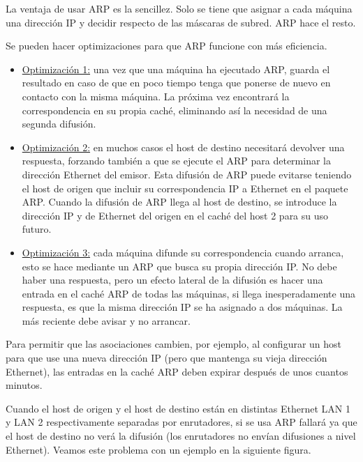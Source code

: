 	\par La ventaja de usar ARP es la sencillez. Solo se tiene que asignar a cada máquina una dirección IP y decidir respecto de las máscaras de subred. ARP hace el resto.
	
	\par Se pueden hacer optimizaciones para que ARP funcione con más eficiencia.
	
		\begin{itemize}
			\item \underline{Optimización 1:} una vez que una máquina ha ejecutado ARP, guarda el resultado en caso de que en poco tiempo tenga que ponerse de nuevo en contacto con la misma máquina. La próxima vez encontrará la correspondencia en su propia caché, eliminando así la necesidad de una segunda difusión.

			\item \underline{Optimización 2:} en muchos casos el host de destino necesitará devolver una respuesta, forzando también a que se ejecute el ARP para determinar la dirección Ethernet del emisor. Esta difusión de ARP puede evitarse teniendo el host de origen que incluir su correspondencia IP a Ethernet en el paquete ARP. Cuando la difusión de ARP llega al host de destino, se introduce la dirección IP y de Ethernet del origen en el caché del host 2 para su uso futuro.
			
			\item \underline{Optimización 3:} cada máquina difunde su correspondencia cuando arranca, esto se hace mediante un ARP que busca su propia dirección IP. No debe haber una respuesta, pero un efecto lateral de la difusión es hacer una entrada en el caché ARP de todas las máquinas, si llega inesperadamente una respuesta, es que la misma dirección IP se ha asignado a dos máquinas. La más reciente debe avisar y no arrancar.
		\end{itemize}

	\par Para permitir que las asociaciones cambien, por ejemplo, al configurar un host para que use una nueva dirección IP (pero que mantenga su vieja dirección Ethernet), las entradas en la caché ARP deben expirar después de unos cuantos minutos.
	
	\par Cuando el host de origen y el host de destino están en distintas Ethernet LAN 1 y LAN 2 respectivamente separadas por enrutadores, si se usa ARP fallará ya que el host de destino no verá la difusión (los enrutadores no envían difusiones a nivel Ethernet). Veamos este problema con un ejemplo en la siguiente figura.
	
